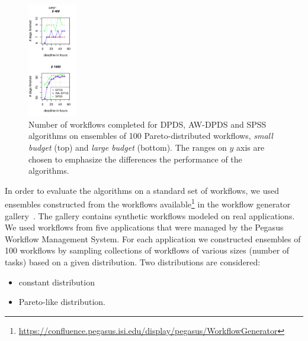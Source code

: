 \documentclass{sig-alternate}
\begin{document}
\begin{figure}[t]
\includegraphics[width=0.19\textwidth]{figures/pareto-SIPHT-n-1000-8-dagh5-50m0.pdf}
\caption{Number of workflows completed for DPDS, AW-DPDS and SPSS
algorithms on ensembles of 100 Pareto-distributed workflows, {\em small budget}
(top) and {\em large budget} (bottom). The ranges on $y$ axis are chosen to 
emphasize the differences the performance of the algorithms.}
\label{fig:number-complete-pareto}
\end{figure}


In order to evaluate the algorithms on a standard set of workflows, we used
ensembles constructed from the workflows available\footnote{\url{https://confluence.pegasus.isi.edu/display/pegasus/WorkflowGenerator}}
in the workflow generator gallery~\cite{Bharathi08}. The gallery contains synthetic
workflows modeled on real applications. We used workflows from five applications 
that were managed by the Pegasus Workflow Management System. For each
application we constructed ensembles of 100 workflows by sampling collections of
workflows of various sizes (number of tasks) based on a given distribution.
Two distributions are considered:

\begin{itemize}
  \item constant distribution
  \item Pareto-like distribution.
\end{itemize}
\end{document}
